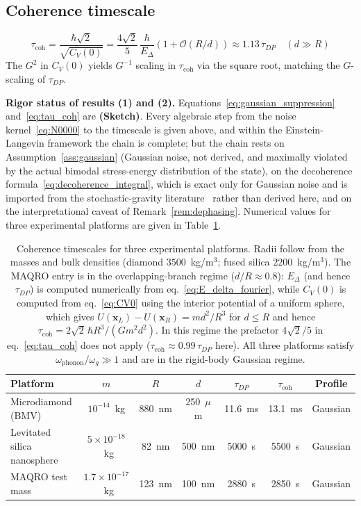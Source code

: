\documentclass[12pt,a4paper]{article}
\theoremstyle{remark}
\begin{document}
\subsection{Coherence timescale}

\begin{equation}
\tau_{\text{coh}} = \frac{\hbar\sqrt{2}}{\sqrt{C_V(0)}}
= \frac{4\sqrt{2}}{5}\,\frac{\hbar}{E_\Delta}\left(1 + \mathcal{O}(R/d)\right)
\approx 1.13\,\tau_{DP} \quad (d \gg R)
\label{eq:tau_coh}
\end{equation}
The $G^2$ in $C_V(0)$ yields $G^{-1}$ scaling in $\tau_{\text{coh}}$ via the square root,
matching the $G$-scaling of $\tau_{DP}$.

\textbf{Rigor status of results (1) and (2).} Equations~\eqref{eq:gaussian_suppression}
and~\eqref{eq:tau_coh} are \textbf{(Sketch)}. Every algebraic step from the noise
kernel~\eqref{eq:N0000} to the timescale is given above, and within the Einstein-Langevin
framework the chain is complete; but the chain rests on
Assumption~\ref{ass:gaussian} (Gaussian noise, not derived, and maximally violated by the
actual bimodal stress-energy distribution of the state), on the decoherence
formula~\eqref{eq:decoherence_integral}, which is exact only for Gaussian noise and is
imported from the stochastic-gravity literature~\cite{hu_verdaguer} rather than derived
here, and on the interpretational caveat of Remark~\ref{rem:dephasing}. Numerical values
for three experimental platforms are given in Table~\ref{tab:platforms}.

\begin{table}[h]
\centering
\begin{tabular}{lcccccc}
\toprule
Platform & $m$ & $R$ & $d$ & $\tau_{DP}$ & $\tau_{\text{coh}}$ & Profile \\
\midrule
Microdiamond (BMV)~\cite{bose} & $10^{-14}$~kg & 880~nm & 250~$\mu$m & 11.6~ms & 13.1~ms & Gaussian \\
Levitated silica nanosphere & $5\times10^{-18}$~kg & 82~nm & 500~nm & 5000~s & 5500~s & Gaussian \\
MAQRO test mass~\cite{maqro} & $1.7\times10^{-17}$~kg & 123~nm & 100~nm & 2880~s & 2850~s & Gaussian \\
\bottomrule
\end{tabular}
\caption{Coherence timescales for three experimental platforms. Radii follow from the
masses and bulk densities (diamond $3500$~kg/m$^3$; fused silica $2200$~kg/m$^3$). The
MAQRO entry is in the overlapping-branch regime ($d/R \approx 0.8$): $E_\Delta$ (and hence
$\tau_{DP}$) is computed numerically from eq.~\eqref{eq:E_delta_fourier}, while $C_V(0)$
is computed from eq.~\eqref{eq:CV0} using the interior potential of a uniform sphere,
which gives $U(\mathbf{x}_L)-U(\mathbf{x}_R) = md^2/R^3$ for $d \le R$ and hence
$\tau_{\text{coh}} = 2\sqrt{2}\,\hbar R^3/(Gm^2d^2)$. In this regime the prefactor
$4\sqrt{2}/5$ in eq.~\eqref{eq:tau_coh} does not apply ($\tau_{\text{coh}} \approx
0.99\,\tau_{DP}$ here). All three platforms satisfy
$\omega_{\text{phonon}}/\omega_g \gg 1$ and are in the rigid-body Gaussian regime.}
\label{tab:platforms}
\end{table}
\end{document}
